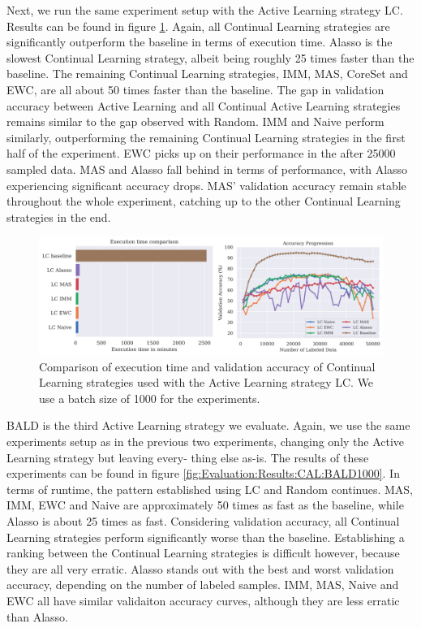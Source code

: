 Next, we run the same experiment setup with the Active Learning strategy LC. Results can be found in figure \ref{fig:Evaluation:Results:CAL:LC1000}. Again, all Continual Learning strategies
are significantly outperform the baseline in terms of execution time. Alasso is the slowest Continual Learning strategy, albeit being roughly 25 times faster than the baseline. The remaining Continual
Learning strategies, IMM, MAS, CoreSet and EWC, are all about 50 times faster than the baseline. The gap in validation accuracy between Active Learning and all Continual Active Learning strategies
remains similar to the gap observed with Random. IMM and Naive perform similarly, outperforming the remaining Continual Learning strategies in the first half of the experiment. EWC picks up on their
performance in the after 25000 sampled data. MAS and Alasso fall behind in terms of performance, with Alasso experiencing significant accuracy drops. MAS' validation accuracy remain stable throughout
the whole experiment, catching up to the other Continual Learning strategies in the end. \par

\begin{figure} [h]
    \centering
    \includegraphics[width=\linewidth]{images/results_CAL/LC_CAL_1000b.png}
    \caption[Continual Active Learning LC 1000 batch size]{Comparison of execution time and validation accuracy of Continual Learning strategies used with the Active Learning strategy LC.
    We use a batch size of 1000 for the experiments.}
    \label{fig:Evaluation:Results:CAL:LC1000}
\end{figure}

BALD is the third Active Learning strategy we evaluate. Again, we use the same experiments setup as in the previous two experiments, changing only the Active Learning strategy but leaving every-
thing else as-is. The results of these experiments can be found in figure \ref{fig:Evaluation:Results:CAL:BALD1000}. In terms of runtime, the pattern established using LC and Random continues.
MAS, IMM, EWC and Naive are approximately 50 times as fast as the baseline, while Alasso is about 25 times as fast. Considering validation accuracy, all Continual Learning strategies perform significantly
worse than the baseline. Establishing a ranking between the Continual Learning strategies is difficult however, because they are all very erratic. Alasso stands out with the best and worst validation
accuracy, depending on the number of labeled samples. IMM, MAS, Naive and EWC all have similar validaiton accuracy curves, although they are less erratic than Alasso. \par

